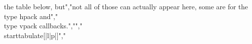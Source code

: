  the table below, but","not all of those can actually appear here, some are for the \\type {hpack} and","\\type {vpack} callbacks.","","\\starttabulate[|l|p|]","%